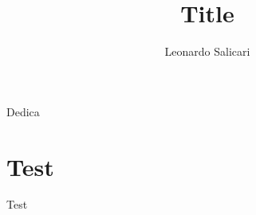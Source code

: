 \documentclass[a4paper,11pt,fleqn]{book}
\title{Title}
\author{Leonardo Salicari}
\date{}
\begin{document}
    \maketitle

    \begin{dedication}
        Dedica
    \end{dedication}
    \thispagestyle{empty} %

    \frontmatter
    \tableofcontents
    \listoffigures
    \mainmatter %

    \chapter{Test}
    Test \cite{adams2004}

    \printbibliography
\end{document}
